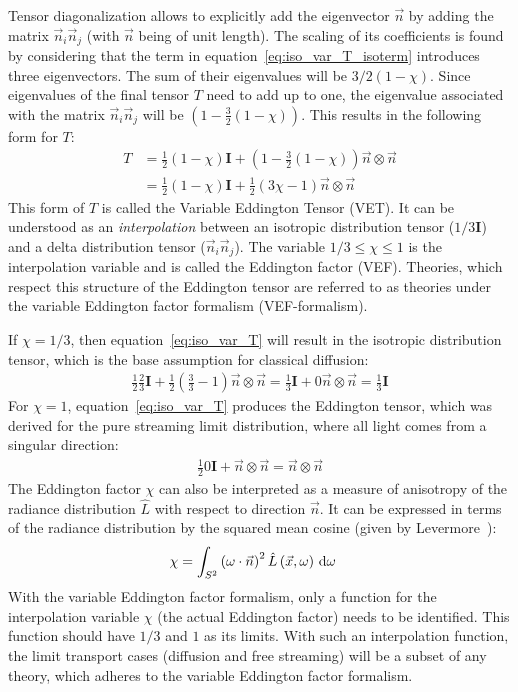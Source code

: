 Tensor diagonalization allows to explicitly add the eigenvector $\vec{n}$ by adding the matrix $\vec{n}_i\vec{n}_j$ (with $\vec{n}$ being of unit length). The scaling of its coefficients is found by considering that the term in equation~\ref{eq:iso_var_T_isoterm} introduces three eigenvectors. The sum of their eigenvalues will be $3/2(1-\chi)$. Since eigenvalues of the final tensor $T$ need to add up to one, the eigenvalue associated with the matrix $\vec{n}_i\vec{n}_j$ will be $\left(1- \frac{3}{2}\left(1 - \chi\right)\right)$. This results in the following form for $T$:
\begin{align}
T &= \frac{1}{2}\left(1-\chi\right)\mathbf{I} + \left(1- \frac{3}{2}\left(1 - \chi\right)\right) \vec{n}\otimes\vec{n}
\nonumber
\\
&= \frac{1}{2}\left(1-\chi\right)\mathbf{I} + \frac{1}{2}\left(3\chi-1\right) \vec{n}\otimes\vec{n}
\label{eq:iso_var_T}
\end{align}
This form of $T$ is called the Variable Eddington Tensor (VET). It can be understood as an \emph{interpolation} between an isotropic distribution tensor ($1/3\mathbf{I}$) and a delta distribution tensor ($\vec{n}_i\vec{n}_j$). The variable $1/3 \le \chi \le 1$ is the interpolation variable and is called the Eddington factor (VEF). Theories, which respect this structure of the Eddington tensor are referred to as theories under the variable Eddington factor formalism (VEF-formalism).

If $\chi=1/3$, then equation~\ref{eq:iso_var_T} will result in the isotropic distribution tensor, which is the base assumption for classical diffusion:
\begin{align}
\frac{1}{2}\frac{2}{3}\mathbf{I} + \frac{1}{2}\left(\frac{3}{3}-1\right) \vec{n}\otimes\vec{n}
=\frac{1}{3}\mathbf{I} + 0\vec{n}\otimes\vec{n} = \frac{1}{3}\mathbf{I}
\end{align}
For $\chi=1$, equation~\ref{eq:iso_var_T} produces the Eddington tensor, which was derived for the pure streaming limit distribution, where all light comes from a singular direction:
\begin{align}
\frac{1}{2}0\mathbf{I} + \vec{n}\otimes\vec{n}
= \vec{n}\otimes\vec{n}
\end{align}
The Eddington factor $\chi$ can also be interpreted as a measure of anisotropy of the radiance distribution $\widehat{L}$ with respect to direction $\vec{n}$. It can be expressed in terms of the radiance distribution by the squared mean cosine (given by Levermore~\cite{Levermore84}):
\begin{align}
\chi &= \int_{S^2}{ \left(\omega\cdot\vec{n}\right)^2\hat{L}\left(\vec{x}, \omega\right)\,\mathrm{d}\omega}
\label{eq:iso_var_chi}
\end{align}
With the variable Eddington factor formalism, only a function for the interpolation variable $\chi$ (the actual Eddington factor) needs to be identified. This function should have $1/3$ and $1$ as its limits. With such an interpolation function, the limit transport cases (diffusion and free streaming) will be a subset of any theory, which adheres to the variable Eddington factor formalism.

